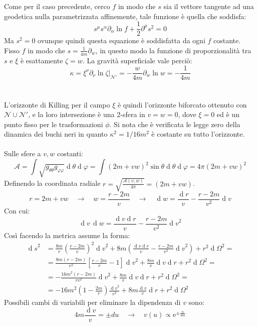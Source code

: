 \documentclass[]{scrartcl}
\newcommand{\me}{\mathrm{e}}
\newcommand{\pd}{\partial}
\renewcommand{\d}[1]{\ensuremath{\operatorname{d}\!{#1}}}
\begin{document}
Come per il caso precedente, cerco $ f $ in modo che $ s $ sia il vettore tangente ad una geodetica nulla parametrizzata affinemente, tale
funzione è quella che soddisfa:
\[
  s^\mu s^\alpha \pd_\alpha \ln f + \frac{1}{2}\pd^\mu s^2 = 0
\]
Ma $ s^2 = 0 $ ovunque quindi questa equazione è soddisfatta da ogni $ f $ costante. Fisso $ f $ in modo che $ s = \frac{1}{4m}\pd_w $, in questo modo
la funzione di proporzionalità tra $ s $ e $ \xi $ è esattamente $ \zeta = w $.
La gravità superficiale vale perciò:
\[
  \kappa = \xi^\nu \pd_\nu \ln \zeta \rvert_\mathcal{N'} = -\frac{w}{4m}\pd_w \ln w = -\frac{1}{4m}
\] \\ \\
L'orizzonte di Killing per il campo $ \xi $ è quindi l'orizzonte biforcato ottenuto con $ \mathcal{N} \cup \mathcal{N}' $, e
la loro intersezione è una 2-sfera in $ v = w = 0 $, dove $ \xi = 0 $ ed è un punto fisso per le trasformazioni $ \phi $.
Si nota che è verificata le legge zero della dinamica dei buchi neri in quanto $ \kappa^2 = 1 \slash 16 m^2 $ è costante su tutto l'orizzonte. \\ \\
Sulle sfere a $ v,w $ costanti:
\[
  \mathcal{A} = \int \sqrt{g_{\theta\theta} g_{\varphi\varphi}} \d \theta \d \varphi = \int (2m + vw)^2 \sin \theta \d \theta  \d \varphi
  = 4 \pi (2m + vw)^2
\]
Definendo la coordinata radiale $ r = \sqrt{\frac{\mathcal{A}(v,w)}{4\pi}} = (2m + vw) $.
\[
  r = 2m + vw \quad \rightarrow \quad w = \frac{r-2m}{v} \quad \rightarrow \quad \d w = \frac{\d r }{v} - \frac{r - 2m}{v^2}\d v
\]
Con cui:
\[
  \d v \, \d w = \frac{\d v \d r }{v} - \frac{r - 2m}{v^2}\d v ^2
\]
Così facendo la metrica assume la forma:
\begin{align*}
  \d s^2 & = \frac{8m}{r} \left( \frac{r-2m}{v} \right)^2 \d v ^2 + 8m \left( \frac{\d v \d r }{v} - \frac{r-2m}{v^2}\d v ^2 \right) + r^2 \d \Omega^2 = \\
       & = \frac{8m(r-2m)}{v^2}\left[ \frac{r-2m}{r} - 1 \right]\d v ^2 + \frac{8m}{v}\d v \d r  +  r^2 \d \Omega^2 = \\
       & = -\frac{16m^2(r-2m)}{r v^2}\d v ^2 + \frac{8m}{v}\d v \d r  +  r^2 \d \Omega^2 = \\
       & = - 16m^2 \left( 1 - \frac{2m}{r} \right) \frac{\d v ^2}{v^2} + 8m \frac{\d v }{v}\d r  +  r^2 \d \Omega^2
\end{align*}
Possibili cambi di variabili per eliminare la dipendenza di $ v $ sono:
\[
  4m\frac{\d v }{v} = \pm du \quad \rightarrow \quad v(u) \propto \me^{\pm \frac{u}{4m}}
\]
\end{document}
